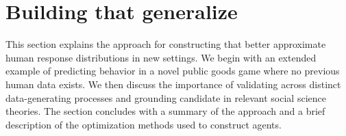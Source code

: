 \section{Building  that generalize}
\label{sec:approach}

This section explains the approach for constructing  that better approximate human response distributions in new settings.
We begin with an extended example of predicting behavior in a novel public goods game where no previous human data exists.
We then discuss the importance of validating across distinct data-generating processes and grounding candidate  in relevant social science theories.
The section concludes with a summary of the approach and a brief description of the optimization methods used to construct agents.
